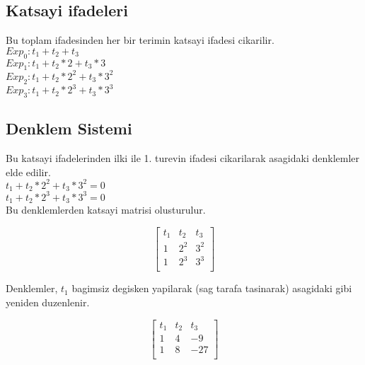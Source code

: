 \documentclass{article}
\begin{document}
\subsection{Katsayi ifadeleri}
Bu toplam ifadesinden her bir terimin katsayi ifadesi cikarilir.\\
$\displaystyle Exp_{0}: t_{1}+t_{2}+t_{3}$\\
$\displaystyle Exp_{1}: t_{1}+t_{2}*2+t_{3}*3$\\
$\displaystyle Exp_{2}: t_{1}+t_{2}*2^{2}+t_{3}*3^{2}$\\
$\displaystyle Exp_{3}: t_{1}+t_{2}*2^{3}+t_{3}*3^{3}$\\
\subsection{Denklem Sistemi}
Bu katsayi ifadelerinden ilki ile 1. turevin ifadesi cikarilarak asagidaki denklemler elde edilir.\\
$\displaystyle t_{1}+t_{2}*2^{2}+t_{3}*3^{2}=0$\\
$\displaystyle t_{1}+t_{2}*2^{3}+t_{3}*3^{3}=0$\\
Bu denklemlerden katsayi matrisi olusturulur.
\begin{center}
$$ \left[\begin{array}{rrr}
t_{1} & t_{2} & t_{3}\\
1 & 2^{2} & 3^{2}\\
1 & 2^{3} & 3^{3}\\
\end{array}\right] $$
\end{center}
Denklemler, $t_{1}$ bagimsiz degisken yapilarak (sag tarafa tasinarak) asagidaki gibi yeniden duzenlenir.\\
\begin{center}
$$ \left[\begin{array}{rr|r}
t_{1} & t_{2} & t_{3}\\
1 & 4 & -9\\
1 & 8 & -27\\
\end{array}\right] $$
\end{center}
\end{document}
